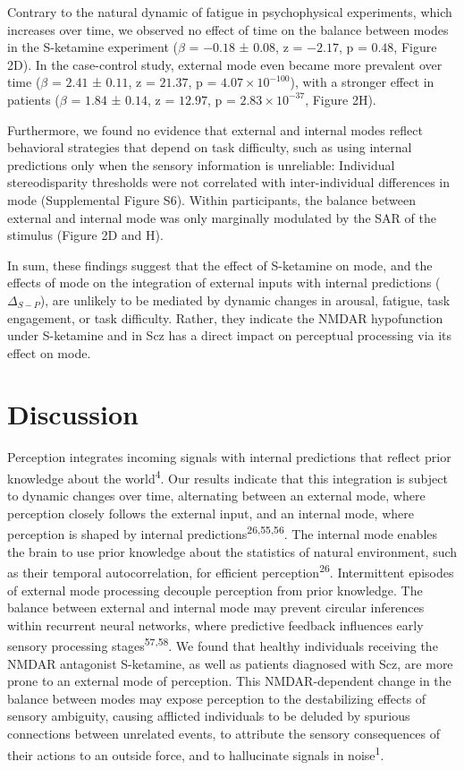 \documentclass[
]{article}
\begin{document}
Contrary to the natural dynamic of fatigue in psychophysical
experiments, which increases over time, we observed no effect of time on
the balance between modes in the S-ketamine experiment (\(\beta\) =
\(-0.18\) ± \(0.08\), z = \(-2.17\), p = \(0.48\), Figure 2D). In the
case-control study, external mode even became more prevalent over time
(\(\beta\) = \(2.41\) ± \(0.11\), z = \(21.37\), p =
\(\ensuremath{4.07\times 10^{-100}}\)), with a stronger effect in
patients (\(\beta\) = \(1.84\) ± \(0.14\), z = \(12.97\), p =
\(\ensuremath{2.83\times 10^{-37}}\), Figure 2H).

Furthermore, we found no evidence that external and internal modes
reflect behavioral strategies that depend on task difficulty, such as
using internal predictions only when the sensory information is
unreliable: Individual stereodisparity thresholds were not correlated
with inter-individual differences in mode (Supplemental Figure S6).
Within participants, the balance between external and internal mode was
only marginally modulated by the SAR of the stimulus (Figure 2D and H).

In sum, these findings suggest that the effect of S-ketamine on mode,
and the effects of mode on the integration of external inputs with
internal predictions (\(\Delta_{S-P}\)), are unlikely to be mediated by
dynamic changes in arousal, fatigue, task engagement, or task
difficulty. Rather, they indicate the NMDAR hypofunction under
S-ketamine and in Scz has a direct impact on perceptual processing via
its effect on mode.

\section{Discussion}\label{discussion}

Perception integrates incoming signals with internal predictions that
reflect prior knowledge about the world\textsuperscript{4}. Our results
indicate that this integration is subject to dynamic changes over time,
alternating between an external mode, where perception closely follows
the external input, and an internal mode, where perception is shaped by
internal predictions\textsuperscript{26,55,56}. The internal mode
enables the brain to use prior knowledge about the statistics of natural
environment, such as their temporal autocorrelation, for efficient
perception\textsuperscript{26}. Intermittent episodes of external mode
processing decouple perception from prior knowledge. The balance between
external and internal mode may prevent circular inferences within
recurrent neural networks, where predictive feedback influences early
sensory processing stages\textsuperscript{57,58}. We found that healthy
individuals receiving the NMDAR antagonist S-ketamine, as well as
patients diagnosed with Scz, are more prone to an external mode of
perception. This NMDAR-dependent change in the balance between modes may
expose perception to the destabilizing effects of sensory ambiguity,
causing afflicted individuals to be deluded by spurious connections
between unrelated events, to attribute the sensory consequences of their
actions to an outside force, and to hallucinate signals in
noise\textsuperscript{1}.
\end{document}
